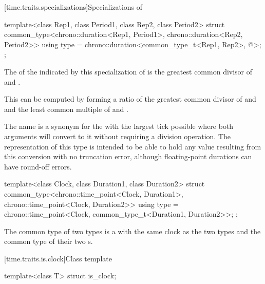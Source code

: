 [time.traits.specializations]{Specializations of }

%
\begin{itemdecl}
template<class Rep1, class Period1, class Rep2, class Period2>
struct common_type<chrono::duration<Rep1, Period1>, chrono::duration<Rep2, Period2>> {
  using type = chrono::duration<common_type_t<Rep1, Rep2>, @\seebelow@>;
};
\end{itemdecl}

\pnum
The  of the  indicated by this specialization of
 is the greatest common divisor of  and
.
\begin{note}
This can be computed by forming a ratio of the
greatest common divisor of  and  and the
least common multiple of  and .
\end{note}

\pnum
\begin{note}
The  name  is a synonym for the
 with the largest tick  possible where both
 arguments will convert to it without requiring a division
operation. The representation of this type is intended to be able to hold any
value resulting from this conversion with no truncation error, although
floating-point durations can have round-off errors.
\end{note}

%
\begin{itemdecl}
template<class Clock, class Duration1, class Duration2>
  struct common_type<chrono::time_point<Clock, Duration1>, chrono::time_point<Clock, Duration2>> {
    using type = chrono::time_point<Clock, common_type_t<Duration1, Duration2>>;
};
\end{itemdecl}

\pnum
The common type of two  types is a  with the same
clock as the two types and the common type of their two s.

[time.traits.is.clock]{Class template }

%
\begin{itemdecl}
template<class T> struct is_clock;
\end{itemdecl}

